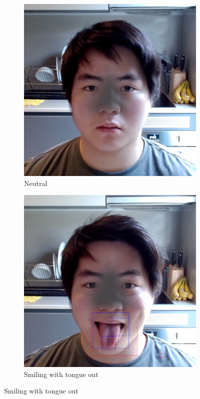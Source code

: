 \documentclass[10pt,twocolumn,letterpaper]{article}
\begin{document}
\begin{figure}[t]
    \centering
    \begin{subfigure}[b]{.49\linewidth}
        \centering
        \includegraphics[width=\linewidth]{Figures/nose_1.png}
        \caption{Neutral}
    \end{subfigure}
    \hfill
    \begin{subfigure}[b]{.49\linewidth}
        \centering
        \includegraphics[width=\linewidth]{Figures/nose_3.png}
        \caption{Smiling with tongue out}
    \end{subfigure}
    

\end{figure}
\end{document}
